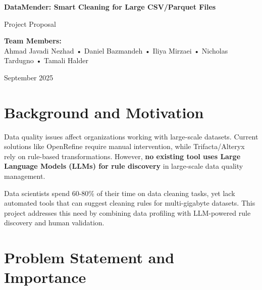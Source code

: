 \documentclass[11pt]{article}
\begin{document}
\begin{center}
    {\Huge\color{primaryblue}\textbf{DataMender: Smart Cleaning for Large CSV/Parquet Files}}
    
    \vspace{0.3cm}
    {\Large\color{darkgray}Project Proposal}
    
    \vspace{0.5cm}
    
    \vspace{0.5cm}
    {\color{darkgray}\textbf{Team Members:}} \\
    Ahmad Javadi Nezhad • Daniel Bazmandeh • Iliya Mirzaei • Nicholas Tardugno • Tamali Halder
    
    \vspace{0.3cm}
    {\color{darkgray}September 2025}
\end{center}

\vspace{0.5cm}

\section{\color{primaryblue}Background and Motivation}

Data quality issues affect organizations working with large-scale datasets. Current solutions like OpenRefine require manual intervention, while Trifacta/Alteryx rely on rule-based transformations. However, \textbf{no existing tool uses Large Language Models (LLMs) for rule discovery} in large-scale data quality management.

Data scientists spend 60-80\% of their time on data cleaning tasks, yet lack automated tools that can suggest cleaning rules for multi-gigabyte datasets. This project addresses this need by combining data profiling with LLM-powered rule discovery and human validation.

\section{\color{primaryblue}Problem Statement and Importance}
\end{document}
